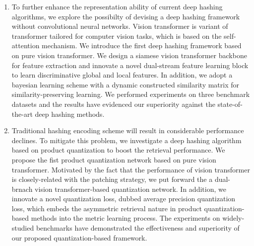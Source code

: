 \begin{abstract*}
\begin{enumerate}
  \item To further enhance the representation ability of current deep hashing algorithms, we explore the possibilty of devising a deep hashing framework without convolutional neural networks. Vision transformer is variant of transformer tailored for computer vision tasks, which is based on the self-attention mechanism. We introduce the first deep hashing framework based on pure vision transformer. We design a siamese vision transformer backbone for feature extraction and innovate a novel dual-stream feature learning block to learn discriminative global and local features. In addition, we adopt a bayesian learning scheme with a dynamic constructed similarity matrix for similarity-preserving learning. We performed experiments on three benchmark datasets and the results have evidenced our superiority against the state-of-the-art deep hashing methods.
  \item Traditional hashing encoding scheme will result in considerable performance declines. To mitigate this problem,  we investigate a deep hashing algorithm based on product quantization to boost the retrieval performance. We propose the fist product quantization network based on pure vision transformer. Motivated by the fact that the performance of vision transformer is closely-related with the patching strategy, we put forward the a dual-brnach vision transformer-based quantization network. In addition, we innovate a novel quantization loss, dubbed average precision quantization loss, which embeds the asymmetric retrieval nature in product quantization-based methods into the metric learning process. The experiments on widely-studied benchmarks have demonstrated the effectiveness and superiority of our proposed quantization-based framework.
\end{enumerate}
\end{abstract*} 

